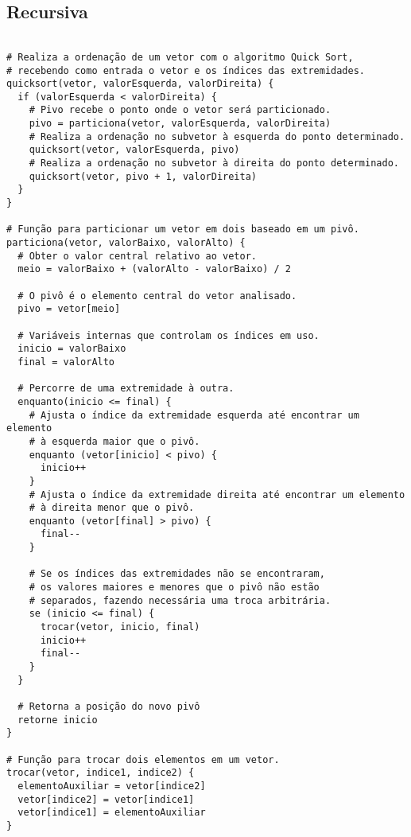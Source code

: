 \subsection{Recursiva}
\begin{verbatim}

# Realiza a ordenação de um vetor com o algoritmo Quick Sort, 
# recebendo como entrada o vetor e os índices das extremidades.
quicksort(vetor, valorEsquerda, valorDireita) { 
  if (valorEsquerda < valorDireita) {
    # Pivo recebe o ponto onde o vetor será particionado.
    pivo = particiona(vetor, valorEsquerda, valorDireita)
    # Realiza a ordenação no subvetor à esquerda do ponto determinado.
    quicksort(vetor, valorEsquerda, pivo)
    # Realiza a ordenação no subvetor à direita do ponto determinado.
    quicksort(vetor, pivo + 1, valorDireita)
  }
}

# Função para particionar um vetor em dois baseado em um pivô.
particiona(vetor, valorBaixo, valorAlto) { 
  # Obter o valor central relativo ao vetor.
  meio = valorBaixo + (valorAlto - valorBaixo) / 2 

  # O pivô é o elemento central do vetor analisado.
  pivo = vetor[meio] 

  # Variáveis internas que controlam os índices em uso.
  inicio = valorBaixo
  final = valorAlto 
  
  # Percorre de uma extremidade à outra.
  enquanto(inicio <= final) { 
    # Ajusta o índice da extremidade esquerda até encontrar um elemento 
    # à esquerda maior que o pivô.
    enquanto (vetor[inicio] < pivo) { 
      inicio++
    }
    # Ajusta o índice da extremidade direita até encontrar um elemento 
    # à direita menor que o pivô.
    enquanto (vetor[final] > pivo) {
      final--
    }

    # Se os índices das extremidades não se encontraram, 
    # os valores maiores e menores que o pivô não estão
    # separados, fazendo necessária uma troca arbitrária.
    se (inicio <= final) {
      trocar(vetor, inicio, final)
      inicio++
      final--
    }
  }
  
  # Retorna a posição do novo pivô
  retorne inicio
}
   
# Função para trocar dois elementos em um vetor.
trocar(vetor, indice1, indice2) { 
  elementoAuxiliar = vetor[indice2]
  vetor[indice2] = vetor[indice1]
  vetor[indice1] = elementoAuxiliar
}
\end{verbatim}

